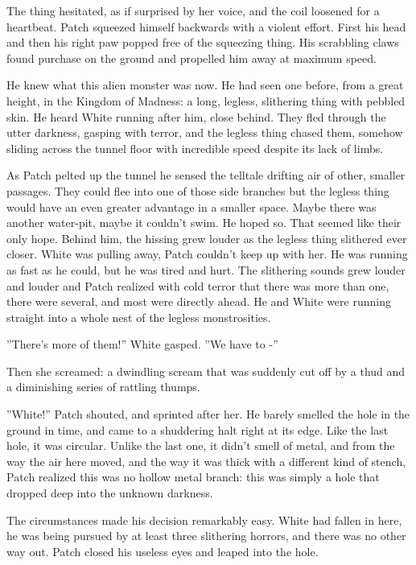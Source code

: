 \documentclass[11pt]{article}
\begin{document}
The thing hesitated, as if surprised by her voice, and the coil loosened for a heartbeat. Patch squeezed himself backwards with a violent effort. First his head and then his right paw popped free of the squeezing thing. His scrabbling claws found purchase on the ground and propelled him away at maximum speed.\par
 He knew what this alien monster was now. He had seen one before, from a great height, in the Kingdom of Madness: a long, legless, slithering thing with pebbled skin. He heard White running after him, close behind. They fled through the utter darkness, gasping with terror, and the legless thing chased them, somehow sliding across the tunnel floor with incredible speed despite its lack of limbs.\par
 As Patch pelted up the tunnel he sensed the telltale drifting air of other, smaller passages. They could flee into one of those side branches %
 but the legless thing would have an even greater advantage in a smaller space. Maybe there was another water-pit, maybe it couldn't swim. He hoped so. That seemed like their only hope. Behind him, the hissing grew louder as the legless thing slithered ever closer. White was pulling away, Patch couldn't keep up with her. He was running as fast as he could, but he was tired and hurt. The slithering sounds grew louder and louder %
 and Patch realized with cold terror that there was more than one, there were several, and most were directly ahead. He and White were running straight into a whole nest of the legless monstrosities.\par
 ''There's more of them!'' White gasped. ''We have to -''\par
 Then she screamed: a dwindling scream that was suddenly cut off by a thud and a diminishing series of rattling thumps.\par
 ''White!'' Patch shouted, and sprinted after her. He barely smelled the hole in the ground in time, and came to a shuddering halt right at its edge. Like the last hole, it was circular. Unlike the last one, it didn't smell of metal, and from the way the air here moved, and the way it was thick with a different kind of stench, Patch realized this was no hollow metal branch: this was simply a hole that dropped deep into the unknown darkness.\par
 The circumstances made his decision remarkably easy. White had fallen in here, he was being pursued by at least three slithering horrors, and there was no other way out. Patch closed his useless eyes and leaped into the hole.\par
\end{document}
